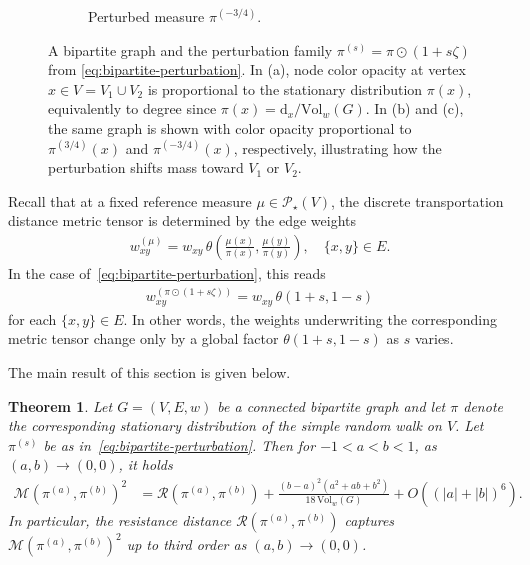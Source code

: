 \documentclass[11pt,a4paper]{article}
\newcommand{\Maas}{\mathcal{M}}
\newcommand{\Resis}{\mathcal{R}}
\newcommand{\Prob}{\mathscr{P}}
\newcommand{\Deg}{\mathrm{d}}
\newcommand{\Vol}{\mathrm{Vol}}
\newtheorem{theorem}{Theorem}[section]
\begin{document}
\begin{figure}[t]
\begin{subfigure}[t]{0.32\textwidth}
        \caption{Perturbed measure $\pi^{(-3/4)}$.}
    \end{subfigure}

    \caption{A bipartite graph and the perturbation family
    $\pi^{(s)}=\pi\odot(1+s\zeta)$ from \cref{eq:bipartite-perturbation}. In (a), node color opacity at vertex $x\in V=V_1\cup V_2$ is proportional to the stationary distribution $\pi(x)$, equivalently to degree since $\pi(x)=\Deg_x/\Vol_w(G)$. In (b) and (c), the same graph is shown with color opacity proportional to $\pi^{(3/4)}(x)$ and $\pi^{(-3/4)}(x)$, respectively, illustrating how the perturbation shifts mass toward $V_1$ or $V_2$.}
    \label{fig:bipartite-perturbation}
\end{figure}


Recall that at a fixed reference measure $\mu\in\Prob_\star(V)$, the discrete transportation distance metric tensor is determined by the edge weights
    \begin{align*}
        w_{xy}^{(\mu)} = w_{xy}\,\theta\left(\frac{\mu(x)}{\pi(x)}, \frac{\mu(y)}{\pi(y)}\right),\quad \{x,y\}\in E.
    \end{align*}
In the case of~\cref{eq:bipartite-perturbation}, this reads
    \begin{align*}
        w_{xy}^{(\pi\odot(1+s\zeta))} = w_{xy}\,\theta(1+s, 1-s)
    \end{align*}
for each $\{x,y\}\in E$. In other words, the weights underwriting the corresponding metric tensor change only by a global factor $\theta(1+s, 1-s)$ as $s$ varies. 

The main result of this section is given below.

\begin{theorem}\label{thm:bipartite-third-order}
    Let $G=(V,E,w)$ be a connected bipartite graph and let $\pi$ denote the corresponding stationary distribution of the simple random walk on $V$. Let $\pi^{(s)}$ be as in~\cref{eq:bipartite-perturbation}. Then for $-1< a < b < 1$, as $(a,b)\to (0,0)$, it holds
        \begin{align*}
            \Maas(\pi^{(a)},\pi^{(b)})^2 &= \Resis(\pi^{(a)},\pi^{(b)}) + \frac{(b-a)^2(a^2+ab+b^2)}{18\,\Vol_w(G)} + O((|a|+|b|)^6).
        \end{align*}
    In particular, the resistance distance $\Resis(\pi^{(a)},\pi^{(b)})$ captures $\Maas(\pi^{(a)},\pi^{(b)})^2$ up to third order as $(a,b)\to(0,0)$.
\end{theorem}
\end{document}

